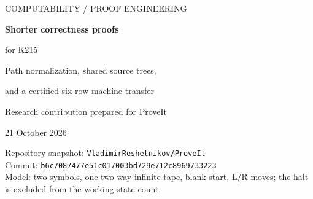 \documentclass[11pt,letterpaper]{article}
\theoremstyle{definition}\newtheorem{definition}[theorem]{Definition}
\theoremstyle{remark}\newtheorem{remark}[theorem]{Remark}
\newcommand{\repo}{\texttt{VladimirReshetnikov/ProveIt}}
\newcommand{\pin}{\texttt{b6c7087477e51c017003bd729e712c8969733223}}
\begin{document}
\hypersetup{pageanchor=false}
\begin{titlepage}
\vspace*{0.8in}
{\Large\color{blue!45!black} COMPUTABILITY / PROOF ENGINEERING\par}
\vspace{0.35in}
{\huge\bfseries Shorter correctness proofs\par for K215\par}
\vspace{0.25in}
{\Large Path normalization, shared source trees,\par and a certified six-row machine transfer\par}
\vspace{0.4in}
{\large Research contribution prepared for ProveIt\par 21 October 2026\par}
\vspace{0.5in}
\begin{abstract}
The primary 215-state consistency machine already has compiled Lean and Rocq
endpoints. The useful next step is to reduce the additional proof required by
a change, and to remove representational duplication from its existing
certificate. We give two concrete contributions. First, identifying source
paths that differ only in implicit trailing zero bits reduces the source
certificate from 2,240 paired checkpoints to 1,426, a reduction of 814
checkpoints (36.34\%). A new Lean checker proves the soundness of this
quotient using the repository's existing segment-bisimulation theorem;
the complete concrete replacement source theorem is kernel-checked.
Second, the existing conditional-marker machine CM215 admits a short relative
correctness proof: three local tape invariants imply that each K215 step is
simulated by one or three CM215 steps. We provide a kernel-checked Lean
proof for every initial binary tape and every initial head position, with
initial control 0. A reusable positive-stuttering theorem is also checked
in Coq. These results reuse the existing ZFC calibration.

The state-reduction search is reported separately and with its exact scope.
This contribution does not claim a verified machine with 214 or fewer
working states, or a lower bound of 215.
\end{abstract}
\vfill
\small Repository snapshot: \repo\\
\small Commit: \pin\\
\small Model: two symbols, one two-way infinite tape, blank start, L/R moves; the halt is excluded from the working-state count.
\end{titlepage}
\hypersetup{pageanchor=true}
\tableofcontents
\newpage
\end{document}
